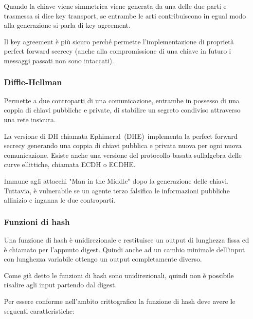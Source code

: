 \documentclass[
]{article}
\begin{document}
{}

{Quando la chiave viene simmetrica viene generata da una delle due parti
e trasmessa si dice key transport, se entrambe le arti contribuiscono in
egual modo alla generazione si parla di key agreement.}

{}

{Il key agreement è più sicuro perché permette l'implementazione di
proprietà perfect forward secrecy (anche alla compromissione di una
chiave in futuro i messaggi passati non sono intaccati).}

\subsubsection{\texorpdfstring{{Diffie-Hellman}}{Diffie-Hellman}}\label{h.dh2to3r1l1xp}

{Permette a due controparti di una comunicazione, entrambe in possesso
di una coppia di chiavi pubbliche e private, di stabilire un segreto
condiviso attraverso una rete insicura. }

{La versione di DH chiamata }{Ephimeral}{~}{(DHE)}{~implementa la
perfect forward secrecy generando una coppia di chiavi pubblica e
privata nuova per ogni nuova comunicazione. Esiste anche una versione
del protocollo basata sull\textquotesingle algebra delle curve
ellittiche, chiamata ECDH o ECDHE.}

{}

{Immune agli attacchi "Man in the Middle" dopo la generazione delle
chiavi. Tuttavia, è vulnerabile se un agente terzo falsifica le
informazioni pubbliche all\textquotesingle inizio e inganna le due
controparti. }

\subsubsection{\texorpdfstring{{Funzioni di
hash}}{Funzioni di hash}}\label{h.p46dj27pgj9g}

{Una funzione di hash è unidirezionale e restituisce un output di
lunghezza fissa ed è chiamato per l'appunto digest. Quindi anche ad un
cambio minimale dell'input con lunghezza variabile ottengo un output
completamente diverso. }

{Come già detto le funzioni di hash sono unidirezionali, quindi non è
possibile risalire agli input partendo dal }{digest.}

{}

{Per essere conforme nell'ambito crittografico la funzione di hash deve
avere le seguenti caratteristiche:}
\end{document}
